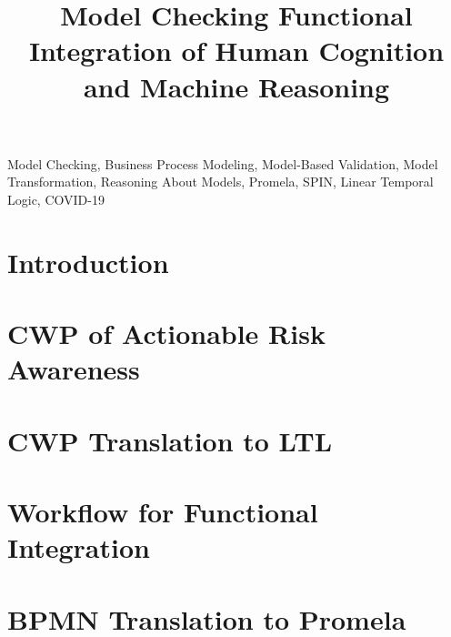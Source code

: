\documentclass[conference]{IEEEtran}
\begin{document}
\title{
  Model Checking Functional Integration of Human Cognition and Machine Reasoning
}

\author{
\and
{}
\and
{}
}

\maketitle

\begin{abstract}
    
\end{abstract}

\begin{IEEEkeywords}
    Model Checking, Business Process Modeling, Model-Based Validation, Model Transformation, Reasoning About Models, Promela, SPIN, Linear Temporal Logic, COVID-19
\end{IEEEkeywords}

\section{Introduction}


\section{CWP of Actionable Risk Awareness}


\section{CWP Translation to LTL}


\section{Workflow for Functional Integration}


\section{BPMN Translation to Promela}
\label{sec:bpmn}

\end{document}
